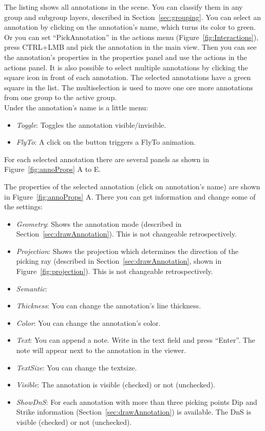 The listing shows all annotations in the scene. You can classify them in any group and subgroup layers, described in Section~\ref{sec:grouping}.
You can select an annotation by clicking on the annotation's name, which turns its color to green. Or you can set ``PickAnnotation'' in the actions menu (Figure~\ref{fig:Interactions}), press CTRL+LMB and pick the annotation in the main view. Then you can see the annotation's properties in the properties panel and use the actions in the actions panel. 
It is also possible to select multiple annotations by clicking the square icon in front of each annotation. The selected annotations have a green square in the list. The multiselection is used to move one ore more annotations from one group to the active group.\\
Under the annotation's name is a little menu:
\begin{itemize}
  \item \textit{Toggle}: Toggles the annotation visible/invisible.
	\item \textit{FlyTo}: A click on the button triggers a FlyTo animation.
\end{itemize}

For each selected annotation there are several panels as shown in Figure~\ref{fig:annoProps} A to E. 

The properties of the selected annotation (click on annotation's name) are shown in Figure~\ref{fig:annoProps} A. There you can get information and change some of the settings:
\begin{itemize}
	\item \textit{Geometry}: Shows the annotation mode (described in Section~\ref{sec:drawAnnotation}). This is not changeable retrospectively.
	\item \textit{Projection}: Shows the projection which determines the direction of the picking ray (described in Section~\ref{sec:drawAnnotation}, shown in Figure~\ref{fig:projection}). This is not changeable retrospectively.
	\item \textit{Semantic}: 
	\item \textit{Thickness}: You can change the annotation's line thickness.
	\item \textit{Color}: You can change the annotation's color.
	\item \textit{Text}: You can append a note. Write in the text field and press ``Enter''. The note will appear next to the annotation in the viewer. 
	\item \textit{TextSize}: You can change the textsize.
	\item \textit{Visible}: The annotation is visible (checked) or not (unchecked).
	\item \textit{ShowDnS}: For each annotation with more than three picking points Dip and Strike information (Section~\ref{sec:drawAnnotation}) is available. The DnS is visible (checked) or not (unchecked).
\end{itemize}

